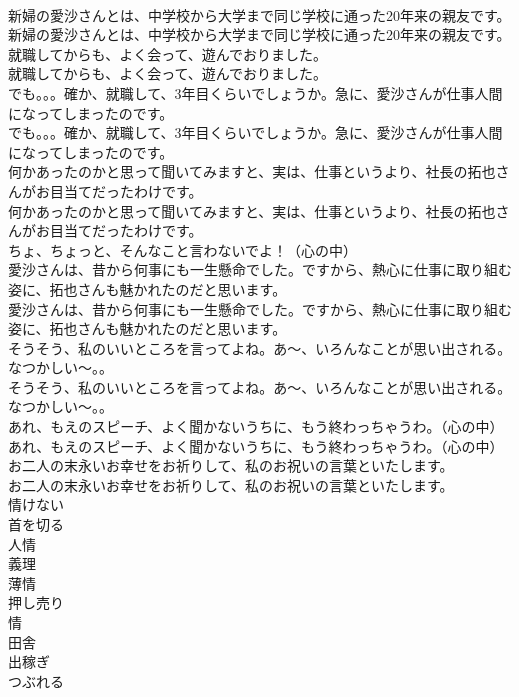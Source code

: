 \documentclass[8pt]{extreport}
\begin{document}
\begin{CJK}{UTF8}{min}
\\	新婦の愛沙さんとは、中学校から大学まで同じ学校に通った20年来の親友です。	
\\	新婦の愛沙さんとは、中学校から大学まで同じ学校に通った20年来の親友です。 
\\	就職してからも、よく会って、遊んでおりました。	
\\	就職してからも、よく会って、遊んでおりました。 
\\	でも。。。確か、就職して、3年目くらいでしょうか。急に、愛沙さんが仕事人間になってしまったのです。	
\\	でも。。。確か、就職して、3年目くらいでしょうか。急に、愛沙さんが仕事人間になってしまったのです。 
\\	何かあったのかと思って聞いてみますと、実は、仕事というより、社長の拓也さんがお目当てだったわけです。	
\\	何かあったのかと思って聞いてみますと、実は、仕事というより、社長の拓也さんがお目当てだったわけです。 
\\	ちょ、ちょっと、そんなこと言わないでよ！（心の中）	
\\	愛沙さんは、昔から何事にも一生懸命でした。ですから、熱心に仕事に取り組む姿に、拓也さんも魅かれたのだと思います。	
\\	愛沙さんは、昔から何事にも一生懸命でした。ですから、熱心に仕事に取り組む姿に、拓也さんも魅かれたのだと思います。 
\\	そうそう、私のいいところを言ってよね。あ～、いろんなことが思い出される。なつかしい～。。	
\\	そうそう、私のいいところを言ってよね。あ～、いろんなことが思い出される。なつかしい～。。 
\\	あれ、もえのスピーチ、よく聞かないうちに、もう終わっちゃうわ。（心の中）	
\\	あれ、もえのスピーチ、よく聞かないうちに、もう終わっちゃうわ。（心の中） 
\\	お二人の末永いお幸せをお祈りして、私のお祝いの言葉といたします。	
\\	お二人の末永いお幸せをお祈りして、私のお祝いの言葉といたします。 
\\	情けない
\\	首を切る
\\	人情
\\	義理
\\	薄情
\\	押し売り
\\	情
\\	田舎
\\	出稼ぎ
\\	つぶれる

\end{CJK}
\end{document}

